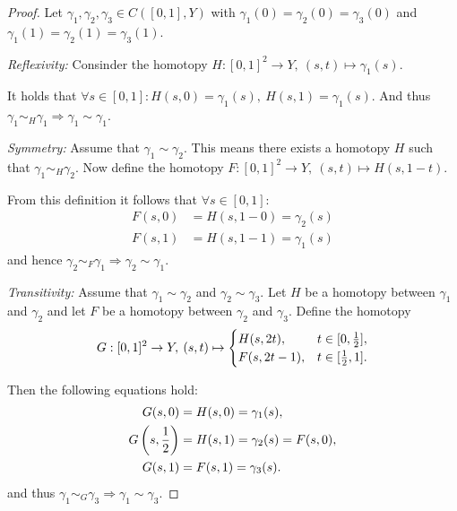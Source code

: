 \documentclass{article}
\theoremstyle{break}
\theoremstyle{break}
\begin{document}
\begin{proof}
  Let $\gamma_1, \gamma_2, \gamma_3 \in C([0,1],Y)$ with $\gamma_1(0) = \gamma_2(0) = \gamma_3(0)$ and $\gamma_1(1) = \gamma_2(1) = \gamma_3(1)$.
  
  \textit{Reflexivity:}
  Consinder the homotopy $H: [0,1]^2 \to Y, \: (s, t) \mapsto \gamma_1(s)$. 
  
  It holds that $\forall s\in [0,1]: H(s, 0) = \gamma_1(s),\: H(s, 1) = \gamma_1(s)$. And thus $\gamma_1 \sim_H \gamma_1 \Rightarrow \gamma_1 \sim \gamma_1$.

  \textit{Symmetry:} 
  Assume that $\gamma_1 \sim \gamma_2$. This means there exists a homotopy $H$ such that $\gamma_1 \sim_H \gamma_2$. 
  Now define the homotopy $F: [0,1]^2 \to Y, \: (s, t) \mapsto H(s, 1-t)$. 
  
  From this definition it follows that $\forall s \in [0,1]:$
  \begin{align*}
    F(s, 0) &= H(s, 1 - 0) = \gamma_2(s) \\
    F(s, 1) &= H(s, 1 - 1) = \gamma_1(s)
  \end{align*}
  and hence $\gamma_2 \sim_F \gamma_1 \Rightarrow \gamma_2 \sim \gamma_1$.

  \textit{Transitivity:}
  Assume that $\gamma_1 \sim \gamma_2$ and $\gamma_2 \sim \gamma_3$. Let $H$ be a homotopy between $\gamma_1$ and $\gamma_2$ and let $F$ be a homotopy between $\gamma_2$ and $\gamma_3$. 
  Define the homotopy
  \begin{equation*} 
    G: [0,1]^2 \to Y, \: (s,t) \mapsto \begin{cases}
      H(s, 2t), &t \in [0, {1 \over 2}], \\
      F(s, 2t - 1), &t \in [{1 \over 2}, 1].
    \end{cases}
  \end{equation*}

  Then the following equations hold:
  \begin{align*}
    G(s,0) &= H(s,0) = \gamma_1(s), \\
    G\left(s,{1 \over 2}\right) &= H(s, 1) = \gamma_2(s) = F(s, 0), \\
    G(s, 1) &= F(s, 1) = \gamma_3(s).
  \end{align*}
  and thus $\gamma_1 \sim_G \gamma_3 \Rightarrow \gamma_1 \sim \gamma_3$.
\end{proof}
\end{document}
